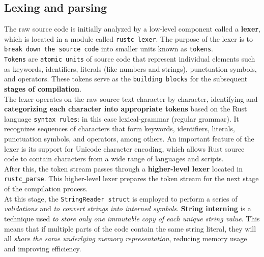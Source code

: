 \documentclass{article}
\begin{document}
\subsection{Lexing and parsing}
The raw source code is initially analyzed by a low-level component called a \textbf{lexer}, which is located in a module called \texttt{rustc\_lexer}. The purpose of the lexer is to \texttt{break down the source code} into smaller units known as \texttt{tokens}.\\\texttt{Tokens} are \texttt{atomic units} of source code that represent individual elements such as keywords, identifiers, literals (like numbers and strings), punctuation symbols, and operators. These tokens serve as the \texttt{building blocks} for the subsequent \textbf{stages of compilation}.\\The lexer operates on the raw source text character by character, identifying and \textbf{categorizing each character into appropriate tokens} based on the Rust language \texttt{syntax rules}: in this case lexical-grammar (regular grammar). It recognizes sequences of characters that form keywords, identifiers, literals, punctuation symbols, and operators, among others.
An important feature of the lexer is its support for Unicode character encoding, which allows Rust source code to contain characters from a wide range of languages and scripts.\\After this, the token stream passes through a \textbf{higher-level lexer} located in \texttt{rustc\_parse}. This higher-level lexer prepares the token stream for the next stage of the compilation process.\\At this stage, the \texttt{StringReader struct} is employed to perform a series of \textit{validations} and \textit{to convert strings into interned symbols}. \textbf{String interning} is a technique used \textit{to store only one immutable copy of each unique string value}. This means that if multiple parts of the code contain the same string literal, they will all \textit{share the same underlying memory representation}, reducing memory usage and improving efficiency.
\end{document}
